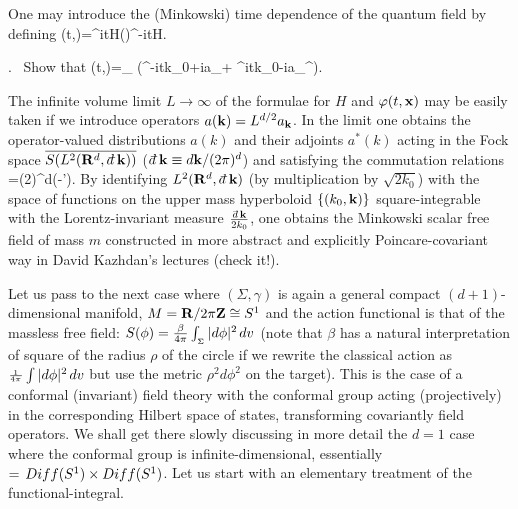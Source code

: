 One may introduce the (Minkowski) time dependence of the
quantum field by defining
\qq
\varphi(t,\Nx)\s=\s\ee^{\m itH}\s\varphi(\Nx)\s\s\ee^{-itH}\s.
\non
\qqq
\vskip 0.3cm

. \ Show that
\qq
\varphi(t,\Nx)\s=\s\sum\limits_\Nk{}
\s\s(\m\ee^{-i\m t\m k_0+i\m \Nk\cdot\Nx}\s\m a_{\Nk}\s+\s
\ee^{i\m t\m k_0-i\m \Nk\cdot\Nx}\s\m a_{\Nk}^{\s*}\m)\s.
\label{mff}
\qqq
\vskip 0.3cm

The infinite volume limit $L\to\infty$ of the formulae for $H$ and
$\varphi(t,{{\bf x}})$ may be easily taken if we introduce operators
$a({{\bf k}})= L^{d/2}a_{{\bf k}}$. In the limit one obtains the operator-valued
distributions $a(k)$ and their adjoints $a^*(k)$ acting in
the Fock space ${\overline{S(L^2(\NR^d,\dd\Nk))}}$ ($\dd\Nk\equiv
d\Nk/(2\pi)^d$) and satisfying the commutation relations
\qq
[a(\Nk),a^*(\Nk')]\s=\s(2\pi)^d\s\delta(\Nk-\Nk')\s.
\non
\qqq
By identifying $L^2(\NR^d,\dd\Nk)$ (by multiplication by $\sqrt{2k_0}$)
with the space of functions on the upper mass hyperboloid
$\{(k_0,{{\bf k}})\}$ square-integrable with the Lorentz-invariant
measure ${\dd\Nk\over2k_0}$, one obtains the Minkowski
scalar free field of mass $m$ constructed in more abstract
and explicitly Poincare-covariant way in David Kazhdan's
lectures (check it!).
\vskip 1cm

\vskip 0.4cm

\no Let us pass to the next case where $(\Sigma,\gamma)$ is
again a general compact $(d+1)$-dimensional manifold, $M={{\bf R}}/2\pi{{\bf Z}}
\cong S^1$ and the action functional is that of the massless
free field: \s$S(\phi)={\beta\over 4\pi}\int_{_\Sigma}|d\phi|^2\hspace{0.05cm}
dv\hspace{0.025cm}$ (note that $\beta$ has a natural interpretation
of square of the radius $\rho$ of the circle if we rewrite the classical
action as ${_1\over^{4\pi}}\int|d\phi|^2\hspace{0.05cm} dv$ but use the metric
$\rho^2d\phi^2$ on the target). This is the case of a conformal
(invariant) field theory with the conformal group acting
(projectively) in the corresponding
Hilbert space of states, transforming covariantly field operators.
We shall get there slowly discussing in more detail the
$d=1$ case where the conformal group is infinite-dimensional,
essentially $=\hspace{0.05cm} Diff(S^1)\times Diff(S^1)$. Let us start with
an elementary treatment of the functional-integral.
\vskip 0.2cm


